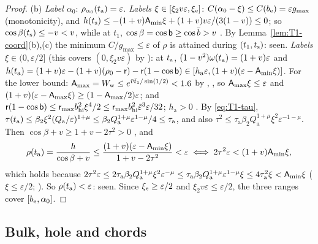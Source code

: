\begin{proof}
(b) \emph{Label $\alpha_0$}: $\rho_{\alpha_0}(t_{\mathrm a})=\varepsilon$. \emph{Labels $\xi\in[\xi_2v\varepsilon,\xi_{\mathrm e}]$}: $C(\alpha_0-\xi)\le
C(b_{\mathrm e})=\varepsilon g_{\max}$ (monotonicity), and $h(t_{\mathrm s})\le-(1+v)\mathsf A_{\min}\xi+(1+v)v\varepsilon/(3(1-v))\le0$; so
$\cos\beta(t_{\mathrm s})\le-v<v$, while at $t_1$, $\cos\beta=\cos\mathsf b\ge\cos\bar b>v$ . By Lemma~\ref{lem:T1-coord}(b),(c) the minimum
$C/g_{\max}\le\varepsilon$ of $\rho$ is attained during $(t_1,t_{\mathrm s})$: seen. \emph{Labels $\xi\in(0,\varepsilon/2]$} (this covers
$(0,\xi_2v\varepsilon)$ by ): at $t_{\mathrm a}$, $(1-v^2)\omega(t_{\mathrm a})=(1+v)\varepsilon$ and
$h(t_{\mathrm a})=(1+v)\varepsilon-(1+v)(\rho_0-\mathsf r)-\mathsf r(1-\cos\mathsf b)\in[h_{\mathrm a}\varepsilon,(1+v)(\varepsilon-\mathsf A_{\min}\xi)]$. For the
lower bound: $\mathsf A_{\max}=W_{\mathrm w}\le e^{\bar v\bar t_1/\sin(1/2)}<1.6$ by , , so $\mathsf A_{\max}\xi\le\varepsilon$ and
$(1+v)(\varepsilon-\mathsf A_{\max}\xi)\ge(1-\mathsf A_{\max}/2)\varepsilon$; and $\mathsf r(1-\cos\mathsf b)\le\mathsf r_{\max}b_{\mathrm{hi}}^2\xi^4/2\le
\mathsf r_{\max}b_{\mathrm{hi}}^2\bar\varepsilon^3\varepsilon/32$; $h_{\mathrm a}>0$ . By \eqref{eq:T1-tau},
$\tau(t_{\mathrm a})\le\beta_2\xi^2(Q_{\mathrm a}/\varepsilon)^{1+\mu}\le\beta_2Q_{\mathrm a}^{1+\mu}\varepsilon^{1-\mu}/4\le\tau_{\mathrm a}$, and also
$\tau^2\le\tau_{\mathrm a}\beta_2Q_{\mathrm a}^{1+\mu}\xi^2\varepsilon^{-1-\mu}$. Then $\cos\beta+v\ge1+v-2\tau^2>0$ , and
\[
\rho(t_{\mathrm a})=\frac h{\cos\beta+v}\le\frac{(1+v)(\varepsilon-\mathsf A_{\min}\xi)}{1+v-2\tau^2}<\varepsilon
\iff2\tau^2\varepsilon<(1+v)\mathsf A_{\min}\xi,
\]
which holds because $2\tau^2\varepsilon\le2\tau_{\mathrm a}\beta_2Q_{\mathrm a}^{1+\mu}\xi^2\varepsilon^{-\mu}\le
\tau_{\mathrm a}\beta_2Q_{\mathrm a}^{1+\mu}\varepsilon^{1-\mu}\xi\le4\tau_{\mathrm a}^2\xi<\mathsf A_{\min}\xi$ ($\xi\le\varepsilon/2$; ). So
$\rho(t_{\mathrm a})<\varepsilon$: seen. Since $\xi_{\mathrm e}\ge\varepsilon/2$ and $\xi_2v\varepsilon\le\varepsilon/2$, the three ranges cover $[b_{\mathrm e},\alpha_0]$.
\end{proof}

\subsection{Bulk, hole and chords}\label{sec:HTp-bulk}

